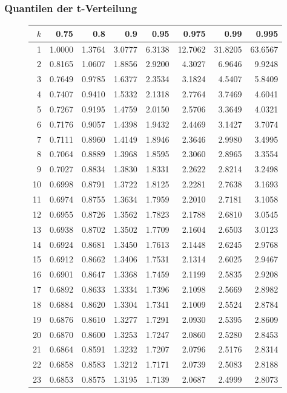 \subsubsection{Quantilen der t-Verteilung}
\begin{figure}[h!]
\scriptsize
\begin{center}
\begin{tabular}{|r|rrrrrrr|}
\hline
$k$&0.75&0.8&0.9&0.95&0.975&0.99&0.995\\
\hline
1&1.0000&1.3764&3.0777&6.3138&12.7062&31.8205&63.6567\\
2&0.8165&1.0607&1.8856&2.9200&4.3027&6.9646&9.9248\\
3&0.7649&0.9785&1.6377&2.3534&3.1824&4.5407&5.8409\\
4&0.7407&0.9410&1.5332&2.1318&2.7764&3.7469&4.6041\\
5&0.7267&0.9195&1.4759&2.0150&2.5706&3.3649&4.0321\\
6&0.7176&0.9057&1.4398&1.9432&2.4469&3.1427&3.7074\\
7&0.7111&0.8960&1.4149&1.8946&2.3646&2.9980&3.4995\\
8&0.7064&0.8889&1.3968&1.8595&2.3060&2.8965&3.3554\\
9&0.7027&0.8834&1.3830&1.8331&2.2622&2.8214&3.2498\\
10&0.6998&0.8791&1.3722&1.8125&2.2281&2.7638&3.1693\\
11&0.6974&0.8755&1.3634&1.7959&2.2010&2.7181&3.1058\\
12&0.6955&0.8726&1.3562&1.7823&2.1788&2.6810&3.0545\\
13&0.6938&0.8702&1.3502&1.7709&2.1604&2.6503&3.0123\\
14&0.6924&0.8681&1.3450&1.7613&2.1448&2.6245&2.9768\\
15&0.6912&0.8662&1.3406&1.7531&2.1314&2.6025&2.9467\\
16&0.6901&0.8647&1.3368&1.7459&2.1199&2.5835&2.9208\\
17&0.6892&0.8633&1.3334&1.7396&2.1098&2.5669&2.8982\\
18&0.6884&0.8620&1.3304&1.7341&2.1009&2.5524&2.8784\\
19&0.6876&0.8610&1.3277&1.7291&2.0930&2.5395&2.8609\\
20&0.6870&0.8600&1.3253&1.7247&2.0860&2.5280&2.8453\\
21&0.6864&0.8591&1.3232&1.7207&2.0796&2.5176&2.8314\\
22&0.6858&0.8583&1.3212&1.7171&2.0739&2.5083&2.8188\\
23&0.6853&0.8575&1.3195&1.7139&2.0687&2.4999&2.8073\\

\end{tabular}
\end{center}
\end{figure}
